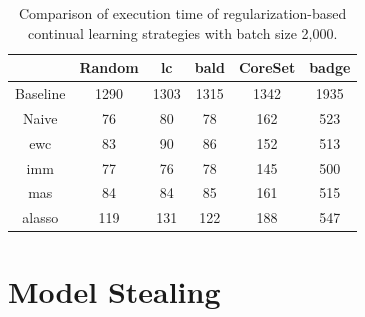 \begin{table}[h]
    \centering
    \begin{tabular}{c | c c c c c } 
         & Random & \gls{lc} & \gls{bald} & CoreSet & \gls{badge}\\ 
        \hline 
        Baseline & 1290 & 1303 & 1315 & 1342 & 1935 \\
        \hline
        Naive & 76 & 80 & 78 & 162 & 523 \\
        \gls{ewc} & 83 & 90 & 86 & 152 & 513\\
        \gls{imm} & 77 & 76 & 78 & 145 & 500\\
        \gls{mas} & 84 & 84 & 85 & 161 & 515\\
        \gls{alasso} & 119 & 131 & 122 & 188 & 547\\
    \end{tabular}
    \caption{Comparison of execution time of regularization-based continual learning strategies
    with batch size 2,000.}
    \label{fig:Appendix:CAL:2000bTimeTable}
\end{table}

\clearpage

\section{Model Stealing}
\label{sec:Appendix:MS}

